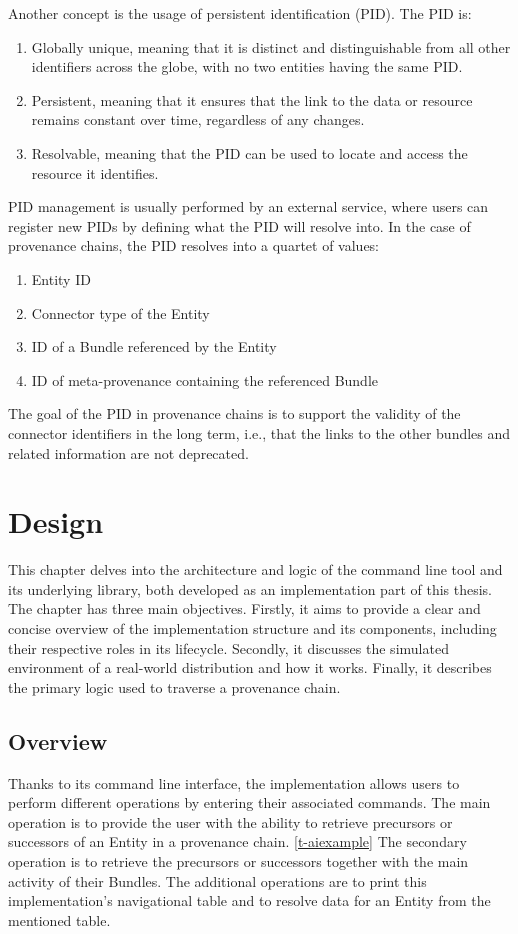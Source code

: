 \documentclass[
  digital,     %
  oneside,     %
  nosansbold,  %
  nocolorbold, %
  lof,         %
  lot,         %
]{fithesis4}
\begin{document}
Another concept is the usage of persistent identification (PID). 
The PID \cite{pid} is:

\begin{enumerate}
    \item Globally unique, meaning that it is distinct and distinguishable from all other identifiers across the globe, with no two entities having the same PID.
    \item Persistent, meaning that it ensures that the link to the data or resource remains constant over time, regardless of any changes.
    \item Resolvable, meaning that the PID can be used to locate and access the resource it identifies.
\end{enumerate}

PID management is usually performed by an external service, where users can register new PIDs by defining what the PID will resolve into. In the case of provenance chains, the PID resolves into a quartet of values:

\begin{enumerate}
    \item Entity ID
    \item Connector type of the Entity
    \item ID of a Bundle referenced by the Entity
    \item ID of meta-provenance containing the referenced Bundle
\end{enumerate}

The goal of the PID in provenance chains is to support the validity of the connector identifiers in the long term, i.e., that the links to the other bundles and related information are not deprecated. 


\chapter{Design}
\shorthandoff{-}
This chapter delves into the architecture and logic of the command line tool and its underlying library, both developed as an implementation part of this thesis. The chapter has three main objectives. Firstly, it aims to provide a clear and concise overview of the implementation structure and its components, including their respective roles in its lifecycle. Secondly, it discusses the simulated environment of a real-world distribution and how it works. Finally, it describes the primary logic used to traverse a provenance chain. 
\shorthandon{-}

\section{Overview}
Thanks to its command line interface, the implementation allows users to perform different operations by entering their associated commands. The main operation is to provide the user with the ability to retrieve precursors or successors of an Entity in a provenance chain. \ref{t-aiexample} The secondary operation is to retrieve the precursors or successors together with the main activity of their Bundles. The additional operations are to print this implementation's navigational table and to resolve data for an Entity from the mentioned table.
\end{document}
